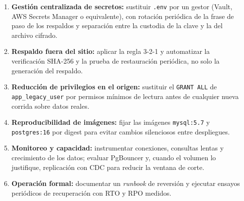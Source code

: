 \begin{enumerate}
  \item \textbf{Gestión centralizada de secretos:} sustituir \texttt{.env} por un
        gestor (Vault, AWS Secrets Manager o equivalente), con rotación
        periódica de la frase de paso de los respaldos y separación entre la
        custodia de la clave y la del archivo cifrado.
  \item \textbf{Respaldo fuera del sitio:} aplicar la regla 3-2-1 y automatizar
        la verificación SHA-256 y la prueba de restauración periódica, no solo
        la generación del respaldo.
  \item \textbf{Reducción de privilegios en el origen:} sustituir el
        \texttt{GRANT ALL} de \texttt{app\_legacy\_user} por permisos mínimos de
        lectura antes de cualquier nueva corrida sobre datos reales.
  \item \textbf{Reproducibilidad de imágenes:} fijar las imágenes
        \texttt{mysql:5.7} y \texttt{postgres:16} por digest para evitar cambios
        silenciosos entre despliegues.
  \item \textbf{Monitoreo y capacidad:} instrumentar conexiones, consultas
        lentas y crecimiento de los datos; evaluar PgBouncer y, cuando el
        volumen lo justifique, replicación con CDC para reducir la ventana de
        corte.
  \item \textbf{Operación formal:} documentar un \emph{runbook} de reversión y
        ejecutar ensayos periódicos de recuperación con RTO y RPO medidos.
\end{enumerate}
